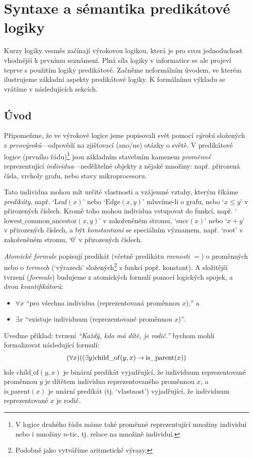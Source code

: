 \chapter{Syntaxe a sémantika predikátové logiky}

Kurzy logiky vesměs začínají výrokovou logikou, která je pro svou jednoduchost vhodnější k prvnímu seznámení. Plná síla logiky v informatice se ale projeví teprve s použitím logiky predikátové.
Začněme neformálním úvodem, ve kterém ilustrujeme základní aspekty predikátové logiky. K formálnímu výkladu se vrátíme v následujících sekcích.

\section{Úvod}
Připomeňme, že ve výrokové logice jsme popisovali svět pomocí \emph{výroků} složených z \emph{prvovýroků}---odpovědí na zjišťovací (ano/ne) otázky o světě. V predikátové logice (prvního řádu)\footnote{V logice druhého řádu máme také proměnné reprezentující množiny individuí nebo i množiny $n$-tic, tj. relace na množině individuí.} jsou základním stavebním kamenem \emph{proměnné} reprezentující \emph{individua}---nedělitelné objekty z nějaké množiny: např. přirozená čísla, vrcholy grafu, nebo stavy mikroprocesoru. 

Tato individua mohou mít určité vlastnosti a vzájemné vztahy, kterým říkáme \emph{predikáty}, např. `$\mathrm{Leaf}(x)$' nebo `$\mathrm{Edge}(x,y)$' mluvíme-li o grafu, nebo `$x\leq y$' v přirozených číslech. Kromě toho mohou individua vstupovat do funkcí, např. `$\mathrm{lowest\_common\_ancestor}(x,y)$' v zakořeněném stromu, `$\mathrm{succ}(x)$' nebo `$x+y$' v přirozených číslech, a být \emph{konstantami} se speciálním významem, např. `$\mathrm{root}$' v zakořeněném stromu, `$0$' v přirozených číslech. 

\emph{Atomické formule} popisují predikát (včetně predikátu \emph{rovnosti} $=$) o proměnných nebo o \emph{termech} (`výrazech' složených\footnote{Podobně jako vytváříme aritmetické výrazy.} z funkcí popř. konstant). A složitější tvrzení (\emph{formule}) budujeme z atomických formulí pomocí logických spojek, a dvou \emph{kvantifikátorů}: 
\begin{itemize}
    \item $\forall x$ ``pro všechna individua (reprezentovaná proměnnou $x$),'' a
    \item $\exists x$ ``existuje individuum (reprezentované proměnnou $x$)''.
\end{itemize}
Uveďme příklad: tvrzení \textit{``Každý, kdo má dítě, je rodič.''} bychom mohli formalizovat následující formulí:
$$
(\forall x)((\exists y)\mathrm{child\_of}(y,x)\mathbin{\rightarrow}\mathrm{is\_parent}(x))
$$
kde $\mathrm{child\_of}(y,x)$ je binární predikát vyjadřující, že individuum reprezentované proměnnou $y$ je dítětem individua reprezentovaného proměnnou $x$, a $\mathrm{is\_parent}(x)$ je unární predikát (tj. `vlastnost') vyjadřující, že individuum reprezentované $x$ je rodič.

